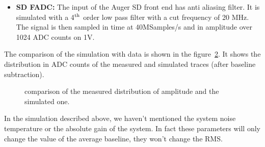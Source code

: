 \begin{itemize}
  function  of  the frequency  for  this  amplifier  is shown  in  the
  figure~\ref{fig:board} (left)  and an  example of simulation  in the
  figure~\ref{fig:board} (right)
\begin{figure}[H]
  \centering
  \hspace*{-3ex}
  \caption{left: the board transfer  function. right: example of board
    simulation, in green  the board is simulated with  a constant gain
    (simple  linear  relation  between  the  power  detector  and  the
    board.),  in  red it  is  simulated  using  the measured  transfer
    function.}
  \label{fig:board}
\end{figure}
\item \textbf{SD FADC:}  The input of the Auger SD  front end has anti
  aliasing filter. It is simulated  with a 4$\rm ^{th}$ order low pass
  filter with a cut frequency of 20 MHz. The signal is then sampled in
  time at 40MSamples/s and in amplitude over 1024 ADC counts on 1V.
\end{itemize}
The  comparison  of   the  simulation  with  data  is   shown  in  the
figure~\ref{fig:compsimdata}. It shows  the distribution in ADC counts
of the measured and simulated traces (after baseline subtraction).
\begin{figure}[!ht]
  \centering
  \hspace*{-3ex}
  \caption{comparison of the measured distribution of amplitude and the simulated one.}
  \label{fig:compsimdata}
\end{figure}
In  the simulation described  above, we  haven't mentioned  the system
noise temperature or  the absolute gain of the  system.  In fact these
parameters will  only change the  value of the average  baseline, they
won't change the RMS.
